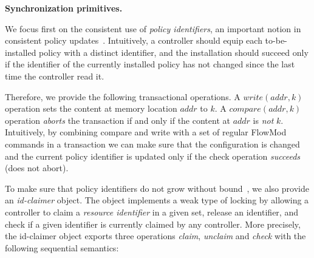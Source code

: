 \documentclass[conference]{sigcomm-alternate}
\newcommand{\hide}[1]{}
\newcommand{\claimcheck}{check\xspace}
\newcommand{\compare}{compare\xspace}
\newcommand{\addr}{\textit{addr}\xspace}
\newcommand{\petr}[1]{\textit{\textcolor{blue}{[petr]: #1}}} %
\begin{document}
\vspace{1mm}
\noindent\textbf{Synchronization primitives.}
%
\hide{

Our approach is based on the distributed management of \emph{identifiers (IDs)} \petr{unclear what "identifiers" mean here}. In particular,
we introduce two new synchronization objects (and describe their implementation in standard OpenFlow),
which allow controllers to coordinate
themselves based on these identifiers.

As we will see, in the OpenFlow implementation of our mechanism,
in addition to the ``normal'' configuration stored at the switch
(e.g., forwarding rules according to network policies),
controllers will maintain additional information
in the switch configuration: this information is used by the
controllers to synchronize.
\petr{"As we will see,..." - looks funny compared with "As we will see ..." at the end of Sec 2}
\subsection{Synchronization Objects}\label{sec:t-if}
}
%
We focus first on the consistent use of  \emph{policy identifiers},
an important notion in consistent policy updates~\cite{network-update,stn}. 
Intuitively, a controller should
equip each to-be-installed policy with a distinct
identifier,
and the installation should succeed only if the identifier of the
currently installed policy has not changed since the last time the
controller read it.

Therefore, we provide the following transactional operations.
A $\textit{write}(\addr,k)$ operation sets the content at memory location
$\addr$ to $k$.
%
%
A $\textit{\compare}(\addr,k)$ operation \emph{aborts} the transaction
if and only if the content at
$\addr$ is \emph{not} $k$.
Intuitively, by combining compare and write with a set of regular
FlowMod commands in a transaction we can make sure that the
configuration is changed and the current policy identifier is updated
only if the check operation \emph{succeeds} (does not abort).

To make sure that policy identifiers do not grow without bound~\cite{stn}, we
also provide an \emph{id-claimer} object.
The object implements a weak type
of locking by allowing a controller to claim a \emph{resource identifier} in a
given set, release an identifier,  and check if a given identifier
is currently claimed by any controller.
%
More precisely, the id-claimer object exports three operations \emph{claim},
\emph{unclaim} and \emph{\claimcheck} with the following sequential
semantics:
\end{document}
